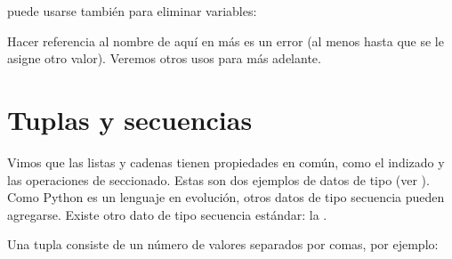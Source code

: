 \documentclass[a4,10pt,spanish]{sphinxmanual}
\begin{document}
\begin{sphinxVerbatim}[commandchars=\\\{\}]
  \PYG{p}{[}     \PYG{p}{]}
 \PYG{p}{[}\PYG{p}{]}
 \PYG{p}{[}\PYG{p}{]}
 \PYG{p}{[}\PYG{p}{]}
\end{sphinxVerbatim}

\sphinxAtStartPar
{} puede usarse también para eliminar variables:

\begin{sphinxVerbatim}[commandchars=\\\{\}]
 
\end{sphinxVerbatim}

\sphinxAtStartPar
Hacer referencia al nombre  de aquí en más es un error (al menos hasta que se le asigne otro valor).  Veremos otros usos para  más adelante.


\section{Tuplas y secuencias}
\label{\detokenize{tutorial/datastructures:tuples-and-sequences}}\label{\detokenize{tutorial/datastructures:tut-tuples}}
\sphinxAtStartPar
Vimos que las listas y cadenas tienen propiedades en común, como el indizado y las operaciones de seccionado.  Estas son dos ejemplos de datos de tipo  (ver ).  Como Python es un lenguaje en evolución, otros datos de tipo secuencia pueden agregarse.  Existe otro dato de tipo secuencia estándar: la .

\sphinxAtStartPar
Una tupla consiste de un número de valores separados por comas, por ejemplo:
\end{document}
